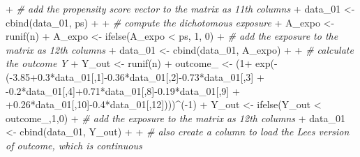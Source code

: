 \documentclass[
]{article}
\newenvironment{Shaded}{\begin{snugshade}}{\end{snugshade}}
\newcommand{\CommentTok}[1]{\textcolor[rgb]{0.56,0.35,0.01}{\textit{#1}}}
\newcommand{\DecValTok}[1]{\textcolor[rgb]{0.00,0.00,0.81}{#1}}
\newcommand{\FloatTok}[1]{\textcolor[rgb]{0.00,0.00,0.81}{#1}}
\newcommand{\FunctionTok}[1]{\textcolor[rgb]{0.00,0.00,0.00}{#1}}
\newcommand{\NormalTok}[1]{#1}
\newcommand{\OtherTok}[1]{\textcolor[rgb]{0.56,0.35,0.01}{#1}}
\newcommand{\SpecialCharTok}[1]{\textcolor[rgb]{0.00,0.00,0.00}{#1}}
\begin{document}
\begin{Shaded}
\begin{Highlighting}[]
\SpecialCharTok{+}   \CommentTok{\# add the propensity score vector to the matrix as 11th columns}
\SpecialCharTok{+}\NormalTok{   data\_01 }\OtherTok{\textless{}{-}} \FunctionTok{cbind}\NormalTok{(data\_01, ps)}
\SpecialCharTok{+}   
\SpecialCharTok{+}   \CommentTok{\# compute the dichotomous exposure}
\SpecialCharTok{+}\NormalTok{   A\_expo }\OtherTok{\textless{}{-}} \FunctionTok{runif}\NormalTok{(n)}
\SpecialCharTok{+}\NormalTok{   A\_expo }\OtherTok{\textless{}{-}} \FunctionTok{ifelse}\NormalTok{(A\_expo }\SpecialCharTok{\textless{}}\NormalTok{ ps, }\DecValTok{1}\NormalTok{, }\DecValTok{0}\NormalTok{)}
\SpecialCharTok{+}   \CommentTok{\# add the exposure to the matrix as 12th columns}
\SpecialCharTok{+}\NormalTok{   data\_01 }\OtherTok{\textless{}{-}} \FunctionTok{cbind}\NormalTok{(data\_01, A\_expo)}
\SpecialCharTok{+}   
\SpecialCharTok{+}   \CommentTok{\# calculate the outcome Y}
\SpecialCharTok{+}\NormalTok{   Y\_out }\OtherTok{\textless{}{-}} \FunctionTok{runif}\NormalTok{(n)}
\SpecialCharTok{+}\NormalTok{   outcome\_ }\OtherTok{\textless{}{-}}\NormalTok{ (}\DecValTok{1}\SpecialCharTok{+} \FunctionTok{exp}\NormalTok{(}\SpecialCharTok{{-}}\NormalTok{(}\SpecialCharTok{{-}}\FloatTok{3.85+0.3}\SpecialCharTok{*}\NormalTok{data\_01[,}\DecValTok{1}\NormalTok{]}\SpecialCharTok{{-}}\FloatTok{0.36}\SpecialCharTok{*}\NormalTok{data\_01[,}\DecValTok{2}\NormalTok{]}\SpecialCharTok{{-}}\FloatTok{0.73}\SpecialCharTok{*}\NormalTok{data\_01[,}\DecValTok{3}\NormalTok{]}
\SpecialCharTok{+}                         \SpecialCharTok{{-}}\FloatTok{0.2}\SpecialCharTok{*}\NormalTok{data\_01[,}\DecValTok{4}\NormalTok{]}\SpecialCharTok{+}\FloatTok{0.71}\SpecialCharTok{*}\NormalTok{data\_01[,}\DecValTok{8}\NormalTok{]}\SpecialCharTok{{-}}\FloatTok{0.19}\SpecialCharTok{*}\NormalTok{data\_01[,}\DecValTok{9}\NormalTok{]}
\SpecialCharTok{+}                         \SpecialCharTok{+}\FloatTok{0.26}\SpecialCharTok{*}\NormalTok{data\_01[,}\DecValTok{10}\NormalTok{]}\SpecialCharTok{{-}}\FloatTok{0.4}\SpecialCharTok{*}\NormalTok{data\_01[,}\DecValTok{12}\NormalTok{])))}\SpecialCharTok{\^{}}\NormalTok{(}\SpecialCharTok{{-}}\DecValTok{1}\NormalTok{)}
\SpecialCharTok{+}\NormalTok{   Y\_out }\OtherTok{\textless{}{-}} \FunctionTok{ifelse}\NormalTok{(Y\_out }\SpecialCharTok{\textless{}}\NormalTok{ outcome\_,}\DecValTok{1}\NormalTok{,}\DecValTok{0}\NormalTok{)}
\SpecialCharTok{+}   \CommentTok{\# add the exposure to the matrix as 12th columns}
\SpecialCharTok{+}\NormalTok{   data\_01 }\OtherTok{\textless{}{-}} \FunctionTok{cbind}\NormalTok{(data\_01, Y\_out)}
\SpecialCharTok{+}   
\SpecialCharTok{+}   \CommentTok{\# also create a column to load the Lee\textquotesingle{}s version of outcome, which is continuous}

\end{Highlighting}
\end{Shaded}
\end{document}

